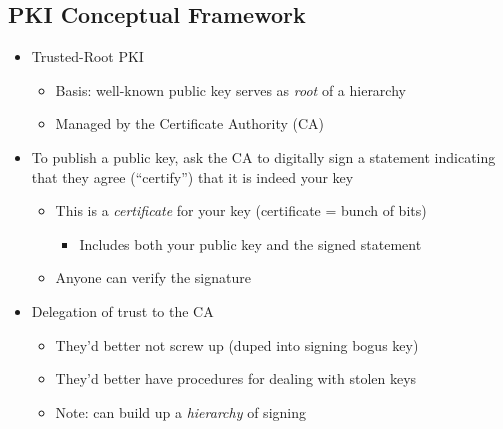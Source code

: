 \subsection{PKI Conceptual Framework}
\begin{itemize}[nosep]
    \item Trusted-Root PKI
          \begin{itemize}[nosep]
              \item Basis: well-known public key serves as \emph{root} of a hierarchy
              \item Managed by the Certificate Authority (CA)
          \end{itemize}
    \item To publish a public key, ask the CA to digitally sign a statement indicating that they agree (``certify'') that it is indeed your key
          \begin{itemize}[nosep]
              \item This is a \emph{certificate} for your key (certificate = bunch of bits)
                    \begin{itemize}[nosep]
                        \item Includes both your public key and the signed statement
                    \end{itemize}
              \item Anyone can verify the signature
          \end{itemize}
    \item Delegation of trust to the CA
          \begin{itemize}[nosep]
              \item They'd better not screw up (duped into signing bogus key)
              \item They'd better have procedures for dealing with stolen keys
              \item Note: can build up a \emph{hierarchy} of signing
          \end{itemize}
\end{itemize}

